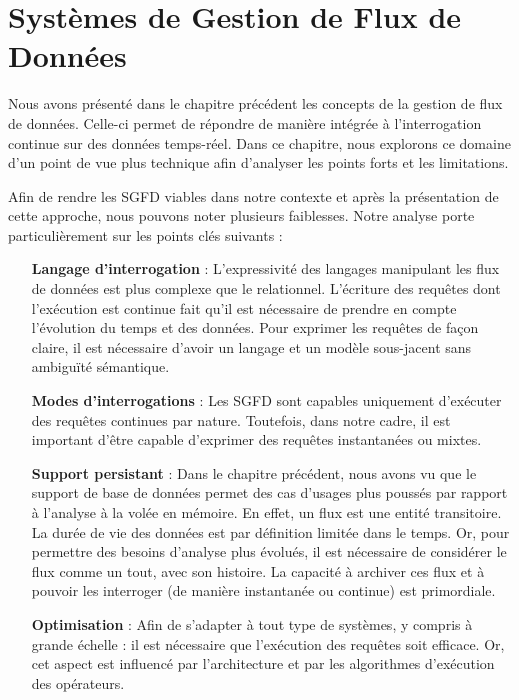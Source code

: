 
\chapter{Systèmes de Gestion de Flux de Données}\label{chap:rw:sgfd}
\chaptertoc
Nous avons présenté dans le chapitre précédent les concepts de la gestion de flux de données. Celle-ci permet de répondre de manière intégrée à l'interrogation continue sur des données temps-réel. Dans ce chapitre, nous explorons ce domaine d'un point de vue plus technique afin d'analyser les points forts et les limitations.

Afin de rendre les SGFD viables dans notre contexte et après la présentation de cette approche, nous pouvons noter plusieurs faiblesses. Notre analyse porte particulièrement sur les points clés suivants : 
\begin{itemize}
	\item[\textbf{Langage d'interrogation}] : L'expressivité des langages manipulant les flux de données est plus complexe que le relationnel. L'écriture des requêtes dont l'exécution est continue fait qu'il est nécessaire de prendre en compte l'évolution du temps et des données. Pour exprimer les requêtes de façon claire, il est nécessaire d'avoir un langage et un modèle sous-jacent sans ambiguïté sémantique.
	\item[\textbf{Modes d'interrogations}] : Les SGFD sont capables uniquement d'exécuter des requêtes continues par nature. Toutefois, dans notre cadre, il est important d'être capable d'exprimer des requêtes instantanées ou mixtes. 
	\item[\textbf{Support persistant}] : Dans le chapitre précédent, nous avons vu que le support de base de données permet des cas d'usages plus poussés par rapport à l'analyse à la volée en mémoire. En effet, un flux est une entité transitoire. La durée de vie des données est par définition limitée dans le temps. Or, pour permettre des besoins d'analyse plus évolués, il est nécessaire de considérer le flux comme un tout, avec son histoire. La capacité à archiver ces flux et à pouvoir les interroger (de manière instantanée ou continue) est primordiale.
	\item[\textbf{Optimisation}] : Afin de s'adapter à tout type de systèmes, y compris à grande échelle : il est nécessaire que l'exécution des requêtes soit efficace. Or, cet aspect est influencé par l'architecture et par les algorithmes d'exécution des opérateurs.
\end{itemize}

